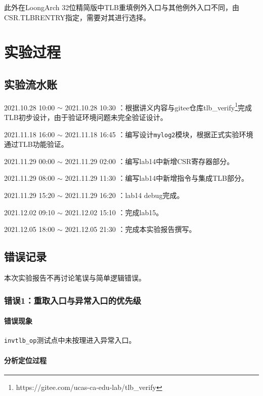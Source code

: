 \documentclass[UTF-8,twoside,c5size]{ctexart}
\begin{document}
    此外在LoongArch 32位精简版中TLB重填例外入口与其他例外入口不同，由CSR.TLBRENTRY指定，需要对其进行选择。

	\section{实验过程}
	
	\subsection{实验流水账}
	
	2021.10.28 10:00 $\sim$ 2021.10.28 10:30 ：根据讲义内容与gitee仓库tlb\_verify\footnote{https://gitee.com/ucas-ca-edu-lab/tlb_verify}完成TLB初步设计，由于验证环境问题未完全验证设计。
    
    2021.11.18 16:00 $\sim$ 2021.11.18 16:45 ：编写设计\texttt{mylog2}模块，根据正式实验环境通过TLB功能验证。
    
    2021.11.29 00:00 $\sim$ 2021.11.29 02:00 ：编写lab14中新增CSR寄存器部分。
    
    2021.11.29 08:00 $\sim$ 2021.11.29 11:30 ：编写lab14中新增指令与集成TLB部分。
    
    2021.11.29 15:20 $\sim$ 2021.11.29 16:20 ：lab14 debug完成。
    
    2021.12.02 09:10 $\sim$ 2021.12.02 15:10 ：完成lab15。
    
    2021.12.05 18:00 $\sim$ 2021.12.05 21:30 ：完成本实验报告撰写。
    
	\subsection{错误记录}
    本次实验报告不再讨论笔误与简单逻辑错误。
    
	\subsubsection{错误\textbf{1：}重取入口与异常入口的优先级}
    \paragraph{错误现象}\hfill
    
    \texttt{invtlb\_op}测试点中未按理进入异常入口。
    
    \paragraph{分析定位过程}\hfill
    
\end{document}

